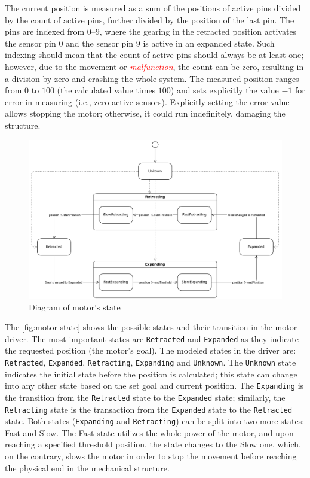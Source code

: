 \documentclass[
  digital,     %
  oneside,     %
  nosansbold,  %
  nocolorbold, %
  nolof,         %
  nolot,         %
]{fithesis4}
\newcommand{\TODO}[1]{\textcolor{red}{\textit{#1}}}
\begin{document}
{{{The current position is measured as a sum of the positions of active pins divided by the count of active pins, further divided by the position of the last pin. The pins are indexed from $\numrange{0}{9}$, where the gearing in the retracted position activates the sensor pin $0$ and the sensor pin $9$ is active in an expanded state. Such indexing should mean that the count of active pins should always be at least one; however, due to the movement or \TODO{malfunction}, the count can be zero, resulting in a division by zero and crashing the whole system. The measured position ranges from $0$ to $100$ (the calculated value times $100$) and sets explicitly the value $-1$ for error in measuring (i.e., zero active sensors). Explicitly setting the error value allows stopping the motor; otherwise, it could run indefinitely, damaging the structure. 

\begin{figure}
    \includegraphics[width=\textwidth,height=\textheight,keepaspectratio]{assets/motor-state.pdf}
    \caption{Diagram of motor's state}
    \label{fig:motor-state}
\end{figure}

The \autoref{fig:motor-state} shows the possible states and their transition in the motor driver. The most important states are \lstinline|Retracted| and \lstinline|Expanded| as they indicate the requested position (the motor's goal). The modeled states in the driver are: \lstinline|Retracted|, \lstinline|Expanded|, \lstinline|Retracting|, \lstinline|Expanding| and \lstinline|Unknown|. The \lstinline|Unknown| state indicates the initial state before the position is calculated; this state can change into any other state based on the set goal and current position. The \lstinline|Expanding| is the transition from the \lstinline|Retracted| state to the \lstinline|Expanded| state; similarly, the \lstinline|Retracting| state is the transaction from the \lstinline|Expanded| state to the \lstinline|Retracted| state. Both states (\lstinline|Expanding| and \lstinline|Retracting|) can be split into two more states: Fast and Slow. The Fast state utilizes the whole power of the motor, and upon reaching a specified threshold position, the state changes to the Slow one, which, on the contrary, slows the motor in order to stop the movement before reaching the physical end in the mechanical structure.

}}}
\end{document}
